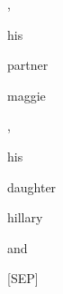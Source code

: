 \documentclass[varwidth=150mm]{standalone}
\begin{document}
\begin{CJK*}{UTF8}{gbsn}
{{{\colorbox{red!2.771084785461426}{\strut ,} \colorbox{red!2.0291943550109863}{\strut his} \colorbox{red!2.492596387863159}{\strut partner} \colorbox{red!10.756367683410645}{\strut maggie} \colorbox{red!4.4947896003723145}{\strut ,} \colorbox{red!1.480373740196228}{\strut his} \colorbox{red!1.1546682119369507}{\strut daughter} \colorbox{red!4.564688682556152}{\strut hillary} \colorbox{red!20.163373947143555}{\strut and} \colorbox{red!0.0}{\strut [SEP]}
}}}
\end{CJK*}
\end{document}
